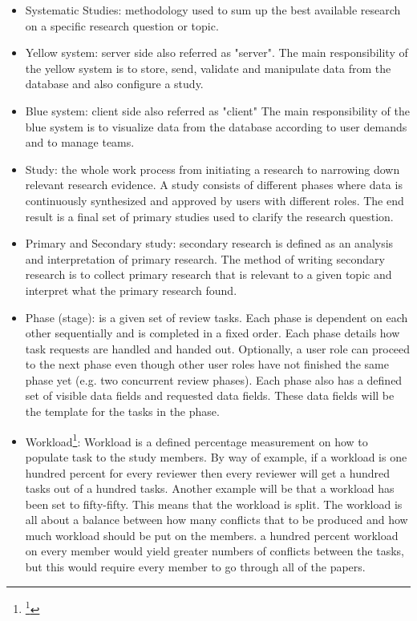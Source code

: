 \begin{itemize}
	\item Systematic Studies: methodology used to sum up the best available research on a specific research question or topic.  
	\item Yellow system: server side also referred as "server". The main responsibility of the yellow system is to store, send, validate and manipulate data from the database and also configure a study.
	\item Blue system: client side also referred as "client" The main responsibility of the blue system is to visualize data from the database according to user demands and to manage teams.
	\item Study: the whole work process from initiating a research to narrowing down relevant research evidence. A study consists of different phases where data is continuously synthesized and approved by users with different roles. The end result is a final set of primary studies used to clarify the research question. 
	\item Primary and Secondary study: secondary research is defined as an analysis and interpretation of primary research. The method of writing secondary research is to collect primary research that is relevant to a given topic and interpret what the primary research found.
	\item Phase (stage): is a given set of review tasks. Each phase is dependent on each other sequentially and is completed in a fixed order. Each phase details how task requests are handled and handed out. Optionally, a user role can proceed to the next phase even though other user roles have not finished the same phase yet (e.g. two concurrent review phases). Each phase also has a defined set of visible data fields and requested data fields. These data fields  will be the template for the tasks in the phase.
	\item Workload\footnote{\footnote{This was added after a discussion with the client. This was added because tasks are now being handled by the system and not defined by users}}: Workload is a defined percentage measurement on how to populate task to the study members. By way of example, if a workload is one hundred percent for every reviewer then every reviewer will get a hundred tasks out of a hundred tasks. Another example will be that a workload has been set to fifty-fifty. This means that the workload is split. The workload is all about a balance between how many conflicts that to be produced and how much workload should be put on the members. a hundred percent workload on every member would yield greater numbers of conflicts between the tasks, but this would require every member to go through all of the papers.

\end{itemize}

